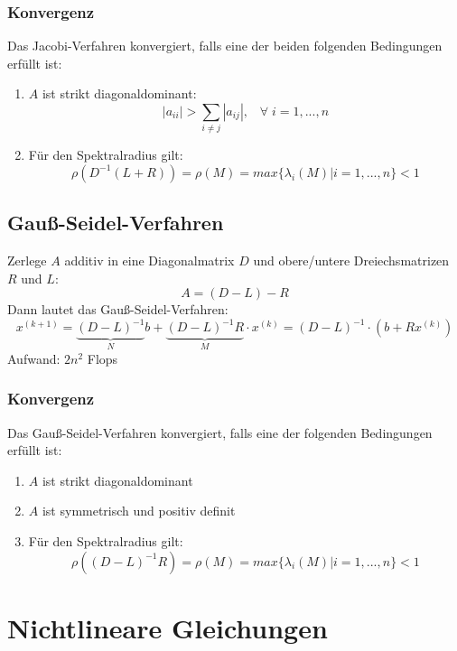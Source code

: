 \documentclass[4pt,a4paper]{scrartcl}
\begin{document}
\begin{multicols}{4}
\subsubsection{Konvergenz}
Das Jacobi-Verfahren konvergiert, falls eine der beiden folgenden Bedingungen erfüllt ist:
\begin{enumerate}[label=$\bullet$]
\item $A$ ist strikt diagonaldominant:
\begin{equation*}
|a_{ii}|>\sum\limits_{i\neq j}|a_{ij}|,\;\;\;\forall\;i=1,...,n
\end{equation*}
\item Für den Spektralradius gilt:
\begin{equation*}
\rho\left(D^{-1}(L+R)\right)=\rho(M)=max\{\lambda_i(M)|i=1,...,n\}<1
\end{equation*}
\end{enumerate}

\subsection{Gauß-Seidel-Verfahren}
Zerlege $A$ additiv in eine Diagonalmatrix $D$ und obere/untere Dreiechsmatrizen $R$ und $L$:
\begin{equation*}
A=(D-L)-R
\end{equation*}
Dann lautet das Gauß-Seidel-Verfahren:
\begin{equation*}
x^{(k+1)}=\underbrace{(D-L)^{-1}}_{N}b+\underbrace{(D-L)^{-1}R}_{M}\cdot x^{(k)}=(D-L)^{-1}\cdot\left(b+Rx^{(k)}\right)
\end{equation*}
Aufwand: $2n^2$ Flops

\subsubsection{Konvergenz}
Das Gauß-Seidel-Verfahren konvergiert, falls eine der folgenden Bedingungen erfüllt ist:
\begin{enumerate}[label=$\bullet$]
\item $A$ ist strikt diagonaldominant
\item $A$ ist symmetrisch und positiv definit
\item Für den Spektralradius gilt:
\begin{equation*}
\rho\left((D-L)^{-1}R\right)=\rho(M)=max\{\lambda_i(M)|i=1,...,n\}<1
\end{equation*}
\end{enumerate}

\section{Nichtlineare Gleichungen}


\end{multicols}
\end{document}
